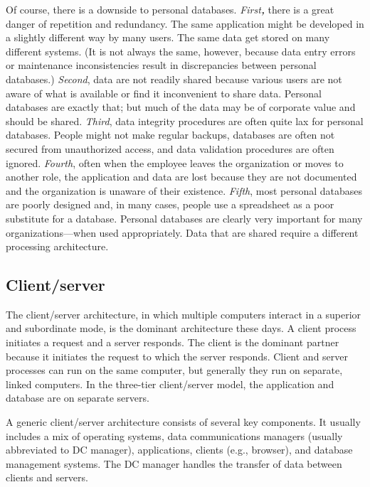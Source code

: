 \documentclass[
]{article}
\begin{document}
Of course, there is a downside to personal databases. \emph{First\textbf{,}} there
is a great danger of repetition and redundancy. The same application
might be developed in a slightly different way by many users. The same
data get stored on many different systems. (It is not always the same,
however, because data entry errors or maintenance inconsistencies result
in discrepancies between personal databases.) \emph{Second}, data are not
readily shared because various users are not aware of what is available
or find it inconvenient to share data. Personal databases are exactly
that; but much of the data may be of corporate value and should be
shared. \emph{Third}, data integrity procedures are often quite lax for
personal databases. People might not make regular backups, databases are
often not secured from unauthorized access, and data validation
procedures are often ignored. \emph{Fourth}, often when the employee leaves
the organization or moves to another role, the application and data are
lost because they are not documented and the organization is unaware of
their existence. \emph{Fifth}, most personal databases are poorly designed
and, in many cases, people use a spreadsheet as a poor substitute for a
database. Personal databases are clearly very important for many
organizations---when used appropriately. Data that are shared require a
different processing architecture.

\hypertarget{clientserver}{%
\subsection*{Client/server}\label{clientserver}}

The client/server architecture, in which multiple computers interact in
a superior and subordinate mode, is the dominant architecture these
days. A client process initiates a request and a server responds. The
client is the dominant partner because it initiates the request to which
the server responds. Client and server processes can run on the same
computer, but generally they run on separate, linked computers. In the
three-tier client/server model, the application and database are on
separate servers.

A generic client/server architecture consists of several key components.
It usually includes a mix of operating systems, data communications
managers (usually abbreviated to DC manager), applications, clients
(e.g., browser), and database management systems. The DC manager handles
the transfer of data between clients and servers.
\end{document}
